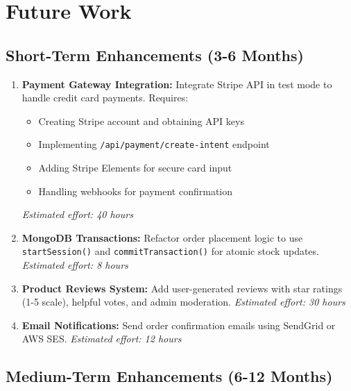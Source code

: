 \documentclass[12pt, a4paper]{report}
\begin{document}
\section{Future Work}

\subsection{Short-Term Enhancements (3-6 Months)}

\begin{enumerate}
    \item \textbf{Payment Gateway Integration:} Integrate Stripe API in test mode to handle credit card payments. Requires:
    \begin{itemize}
        \item Creating Stripe account and obtaining API keys
        \item Implementing \texttt{/api/payment/create-intent} endpoint
        \item Adding Stripe Elements for secure card input
        \item Handling webhooks for payment confirmation
    \end{itemize}
    \textit{Estimated effort: 40 hours}
    
    \item \textbf{MongoDB Transactions:} Refactor order placement logic to use \texttt{startSession()} and \texttt{commitTransaction()} for atomic stock updates.
    \textit{Estimated effort: 8 hours}
    
    \item \textbf{Product Reviews System:} Add user-generated reviews with star ratings (1-5 scale), helpful votes, and admin moderation.
    \textit{Estimated effort: 30 hours}
    
    \item \textbf{Email Notifications:} Send order confirmation emails using SendGrid or AWS SES.
    \textit{Estimated effort: 12 hours}
\end{enumerate}

\subsection{Medium-Term Enhancements (6-12 Months)}
\end{document}
